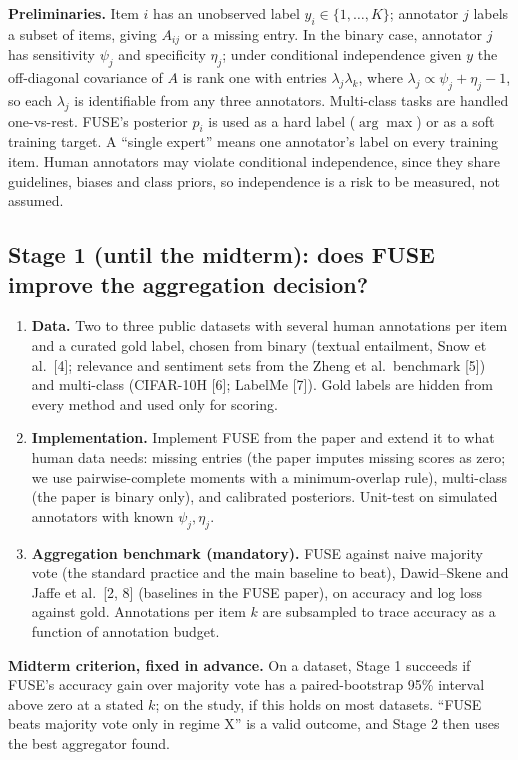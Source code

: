 \documentclass[10pt]{article}
\newcommand{\lead}[1]{\textbf{#1}}
\begin{document}
\textbf{Preliminaries.} Item $i$ has an unobserved label $y_i\in\{1,\dots,K\}$; annotator $j$ labels a subset of items, giving $A_{ij}$ or a missing entry. In the binary case, annotator $j$ has sensitivity $\psi_j$ and specificity $\eta_j$; under conditional independence given $y$ the off-diagonal covariance of $A$ is rank one with entries $\lambda_j\lambda_k$, where $\lambda_j\propto\psi_j+\eta_j-1$, so each $\lambda_j$ is identifiable from any three annotators. Multi-class tasks are handled one-vs-rest. FUSE's posterior $p_i$ is used as a hard label ($\arg\max$) or as a soft training target. A ``single expert'' means one annotator's label on every training item. Human annotators may violate conditional independence, since they share guidelines, biases and class priors, so independence is a risk to be measured, not assumed.

\subsection*{Stage 1 (until the midterm): does FUSE improve the aggregation decision?}

\begin{enumerate}[label=\alph*),leftmargin=18pt]
\item \lead{Data.} Two to three public datasets with several human annotations per item and a curated gold label, chosen from binary (textual entailment, Snow et al.\ [4]; relevance and sentiment sets from the Zheng et al.\ benchmark [5]) and multi-class (CIFAR-10H [6]; LabelMe [7]). Gold labels are hidden from every method and used only for scoring.
\item \lead{Implementation.} Implement FUSE from the paper and extend it to what human data needs: missing entries (the paper imputes missing scores as zero; we use pairwise-complete moments with a minimum-overlap rule), multi-class (the paper is binary only), and calibrated posteriors. Unit-test on simulated annotators with known $\psi_j,\eta_j$.
\item \lead{Aggregation benchmark (mandatory).} FUSE against naive majority vote (the standard practice and the main baseline to beat), Dawid--Skene and Jaffe et al.\ [2, 8] (baselines in the FUSE paper), on accuracy and log loss against gold. Annotations per item $k$ are subsampled to trace accuracy as a function of annotation budget.
\end{enumerate}

\textbf{Midterm criterion, fixed in advance.} On a dataset, Stage 1 succeeds if FUSE's accuracy gain over majority vote has a paired-bootstrap 95\% interval above zero at a stated $k$; on the study, if this holds on most datasets. ``FUSE beats majority vote only in regime X'' is a valid outcome, and Stage 2 then uses the best aggregator found.
\end{document}
